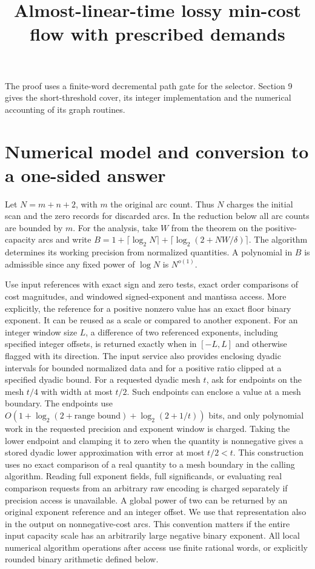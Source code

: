 \documentclass[11pt]{article}
\title{Almost-linear-time lossy min-cost flow with prescribed demands}
\date{}
\begin{document}
\maketitle

The proof uses a finite-word decremental path gate for the selector. Section 9 gives the short-threshold cover, its integer implementation and the numerical accounting of its graph routines.

\hypertarget{numerical-model-and-conversion-to-a-one-sided-answer}{%
\section{Numerical model and conversion to a one-sided answer}\label{numerical-model-and-conversion-to-a-one-sided-answer}}

Let \(N=m+n+2\), with \(m\) the original arc count. Thus \(N\) charges the initial scan and the zero records for discarded arcs. In the reduction below all arc counts are bounded by \(m\). For the analysis, take \(W\) from the theorem on the positive-capacity arcs and write \(B=1+\lceil\log_2 N\rceil+\lceil\log_2(2+NW/\delta)\rceil\). The algorithm determines its working precision from normalized quantities. A polynomial in \(B\) is admissible since any fixed power of \(\log N\) is \(N^{o(1)}\).

Use input references with exact sign and zero tests, exact order comparisons of cost magnitudes, and windowed signed-exponent and mantissa access. More explicitly, the reference for a positive nonzero value has an exact floor binary exponent. It can be reused as a scale or compared to another exponent. For an integer window size \(L\), a difference of two referenced exponents, including specified integer offsets, is returned exactly when in \([-L,L]\) and otherwise flagged with its direction. The input service also provides enclosing dyadic intervals for bounded normalized data and for a positive ratio clipped at a specified dyadic bound. For a requested dyadic mesh \(t\), ask for endpoints on the mesh \(t/4\) with width at most \(t/2\). Such endpoints can enclose a value at a mesh boundary. The endpoints use \(O(1+\log_2(2+\text{range bound})+\log_2(2+1/t))\) bits, and only polynomial work in the requested precision and exponent window is charged. Taking the lower endpoint and clamping it to zero when the quantity is nonnegative gives a stored dyadic lower approximation with error at most \(t/2<t\). This construction uses no exact comparison of a real quantity to a mesh boundary in the calling algorithm. Reading full exponent fields, full significands, or evaluating real comparison requests from an arbitrary raw encoding is charged separately if precision access is unavailable. A global power of two can be returned by an original exponent reference and an integer offset. We use that representation also in the output on nonnegative-cost arcs. This convention matters if the entire input capacity scale has an arbitrarily large negative binary exponent. All local numerical algorithm operations after access use finite rational words, or explicitly rounded binary arithmetic defined below.
\end{document}
